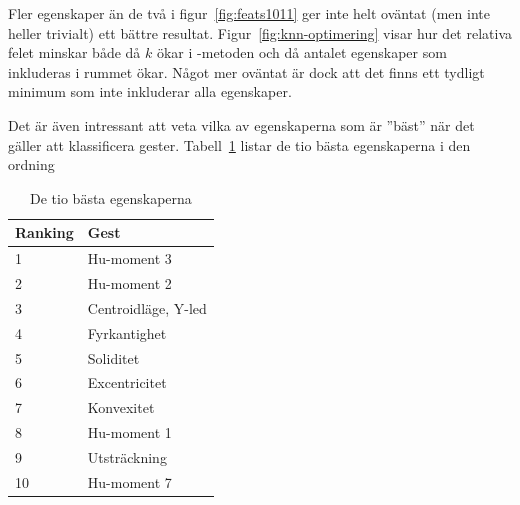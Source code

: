 \documentclass[../rapport_MVEX01-11-05]{subfiles}
\begin{document}
Fler egenskaper än de två i figur~\ref{fig:feats1011} ger inte helt oväntat
(men inte heller trivialt) ett bättre resultat. Figur~\ref{fig:knn-optimering} visar
hur det relativa felet minskar både då $k$ ökar i \knn-metoden och då antalet
egenskaper som inkluderas i rummet ökar. Något mer oväntat är dock att det
finns ett tydligt minimum som inte inkluderar alla egenskaper.

Det är även intressant att veta vilka av egenskaperna som är ''bäst'' när det
gäller att klassificera gester. Tabell~\ref{tab:bestfeats} listar de tio bästa
egenskaperna i den ordning 

\begin{table}[htb]
	\centering
	\caption{De tio bästa egenskaperna}
	\label{tab:bestfeats}
	\begin{tabular}{ll}
		\toprule
		Ranking & Gest \\
		\midrule
		1 & Hu-moment 3 \\
		2 & Hu-moment 2 \\
		3 & Centroidläge, Y-led \\
		4 & Fyrkantighet \\
		5 & Soliditet \\
		6 & Excentricitet \\
		7 & Konvexitet \\
		8 & Hu-moment 1 \\
		9 & Utsträckning \\
		10 & Hu-moment 7 \\
		\bottomrule
	\end{tabular}
\end{table}
\end{document}
